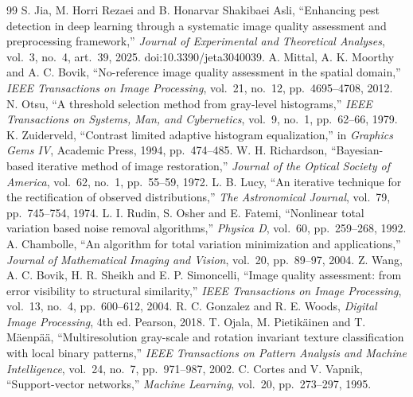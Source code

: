 \documentclass[12pt,a4paper]{article}
\begin{document}
\clearpage\renewcommand{\refname}{References}
\makeatletter\renewcommand{\@biblabel}[1]{#1.}\makeatother
\begin{thebibliography}{99}
\small
{} S. Jia, M. Horri Rezaei and B. Honarvar Shakibaei Asli, ``Enhancing pest detection in deep learning through a systematic image quality assessment and preprocessing framework,'' \textit{Journal of Experimental and Theoretical Analyses}, vol.~3, no.~4, art.~39, 2025. doi:10.3390/jeta3040039.
 A. Mittal, A. K. Moorthy and A. C. Bovik, ``No-reference image quality assessment in the spatial domain,'' \textit{IEEE Transactions on Image Processing}, vol.~21, no.~12, pp.~4695--4708, 2012.
 N. Otsu, ``A threshold selection method from gray-level histograms,'' \textit{IEEE Transactions on Systems, Man, and Cybernetics}, vol.~9, no.~1, pp.~62--66, 1979.
 K. Zuiderveld, ``Contrast limited adaptive histogram equalization,'' in \textit{Graphics Gems IV}, Academic Press, 1994, pp.~474--485.
 W. H. Richardson, ``Bayesian-based iterative method of image restoration,'' \textit{Journal of the Optical Society of America}, vol.~62, no.~1, pp.~55--59, 1972.
 L. B. Lucy, ``An iterative technique for the rectification of observed distributions,'' \textit{The Astronomical Journal}, vol.~79, pp.~745--754, 1974.
 L. I. Rudin, S. Osher and E. Fatemi, ``Nonlinear total variation based noise removal algorithms,'' \textit{Physica D}, vol.~60, pp.~259--268, 1992.
 A. Chambolle, ``An algorithm for total variation minimization and applications,'' \textit{Journal of Mathematical Imaging and Vision}, vol.~20, pp.~89--97, 2004.
 Z. Wang, A. C. Bovik, H. R. Sheikh and E. P. Simoncelli, ``Image quality assessment: from error visibility to structural similarity,'' \textit{IEEE Transactions on Image Processing}, vol.~13, no.~4, pp.~600--612, 2004.
 R. C. Gonzalez and R. E. Woods, \textit{Digital Image Processing}, 4th ed. Pearson, 2018.
 T. Ojala, M. Pietik\"ainen and T. M\"aenp\"a\"a, ``Multiresolution gray-scale and rotation invariant texture classification with local binary patterns,'' \textit{IEEE Transactions on Pattern Analysis and Machine Intelligence}, vol.~24, no.~7, pp.~971--987, 2002.
 C. Cortes and V. Vapnik, ``Support-vector networks,'' \textit{Machine Learning}, vol.~20, pp.~273--297, 1995.

\end{thebibliography}
\end{document}
